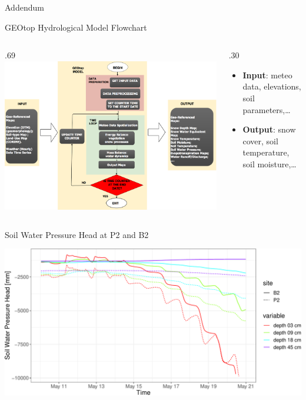 \documentclass[ignorenonframetext,]{beamer}
\def\begincols{\begin{columns}}
\def\begincol{\begin{column}}
\def\endcol{\end{column}}
\def\endcols{\end{columns}}
\begin{document}
\begin{frame}{Addendum}

\end{frame}

\begin{frame}{GEOtop Hydrological Model Flowchart}

\begincols

\begincol{.69\textwidth}
\includegraphics[width=1.00000\textwidth]{resources/images/geotop_revised.png}\\
\endcol

\begincol{.30\textwidth}

\begin{itemize}
\item
  \textbf{Input}: meteo data, elevations, soil parameters,\ldots{}
\item
  \textbf{Output}: snow cover, soil temperature, soil moisture,\ldots{}
\end{itemize}

\endcol
\endcols

\end{frame}

\begin{frame}{Soil Water Pressure Head at P2 and B2}

\includegraphics{presentation_files/figure-beamer/unnamed-chunk-16-1.pdf}

\end{frame}
\end{document}
